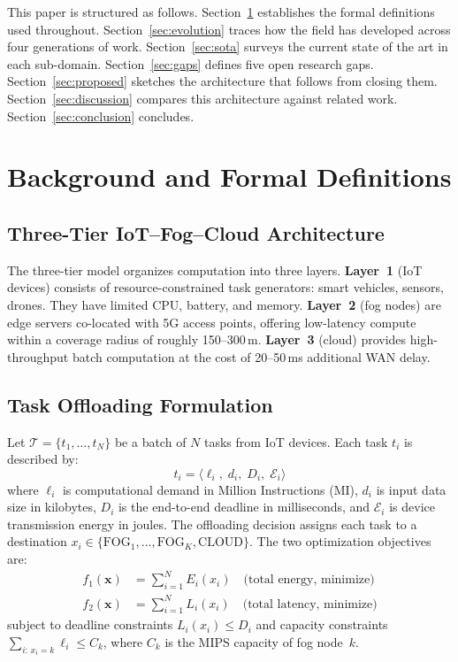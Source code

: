 \documentclass[12pt,a4paper]{article}
\begin{document}
This paper is structured as follows. Section~\ref{sec:background} establishes
the formal definitions used throughout. Section~\ref{sec:evolution} traces
how the field has developed across four generations of work. Section~\ref{sec:sota}
surveys the current state of the art in each sub-domain. Section~\ref{sec:gaps}
defines five open research gaps. Section~\ref{sec:proposed} sketches the
architecture that follows from closing them. Section~\ref{sec:discussion}
compares this architecture against related work. Section~\ref{sec:conclusion}
concludes.

\section{Background and Formal Definitions}
\label{sec:background}

\subsection{Three-Tier IoT--Fog--Cloud Architecture}

The three-tier model organizes computation into three layers. \textbf{Layer~1}
(IoT devices) consists of resource-constrained task generators: smart vehicles,
sensors, drones. They have limited CPU, battery, and memory. \textbf{Layer~2}
(fog nodes) are edge servers co-located with 5G access points, offering
low-latency compute within a coverage radius of roughly 150--300\,m. \textbf{Layer~3}
(cloud) provides high-throughput batch computation at the cost of 20--50\,ms
additional WAN delay.

\subsection{Task Offloading Formulation}

Let $\mathcal{T} = \{t_1, \ldots, t_N\}$ be a batch of $N$ tasks from IoT devices.
Each task $t_i$ is described by:
\begin{equation}
  t_i = \langle \ell_i,\; d_i,\; D_i,\; \mathcal{E}_i \rangle
\end{equation}
where $\ell_i$ is computational demand in Million Instructions (MI), $d_i$ is
input data size in kilobytes, $D_i$ is the end-to-end deadline in milliseconds,
and $\mathcal{E}_i$ is device transmission energy in joules. The offloading
decision assigns each task to a destination
$x_i \in \{\mathrm{FOG}_1, \ldots, \mathrm{FOG}_K, \mathrm{CLOUD}\}$.
The two optimization objectives are:
\begin{align}
  f_1(\mathbf{x}) &= \sum_{i=1}^{N} E_i(x_i) \quad\text{(total energy, minimize)}\\
  f_2(\mathbf{x}) &= \sum_{i=1}^{N} L_i(x_i) \quad\text{(total latency, minimize)}
\end{align}
subject to deadline constraints $L_i(x_i) \leq D_i$ and capacity constraints
$\sum_{i:\,x_i=k} \ell_i \leq C_k$, where $C_k$ is the MIPS capacity of fog node~$k$.
\end{document}
